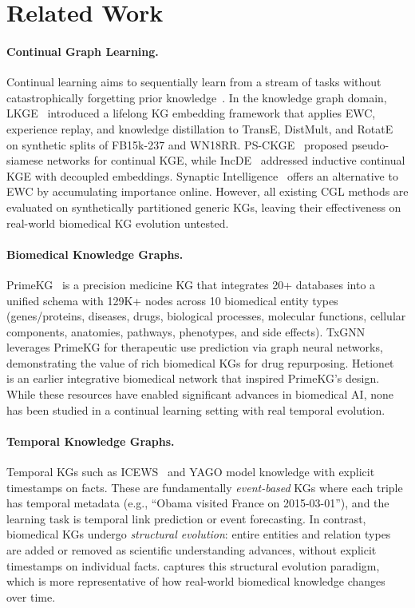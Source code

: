 \section{Related Work}
\label{sec:related}

\paragraph{Continual Graph Learning.}
Continual learning aims to sequentially learn from a stream of tasks without catastrophically forgetting prior knowledge~\citep{Kirkpatrick2017}.
In the knowledge graph domain, LKGE~\citep{Cui2023} introduced a lifelong KG embedding framework that applies EWC, experience replay, and knowledge distillation to TransE, DistMult, and RotatE~\citep{Bordes2013, Yang2015, Sun2019} on synthetic splits of FB15k-237 and WN18RR.
PS-CKGE~\citep{Wu2024} proposed pseudo-siamese networks for continual KGE, while IncDE~\citep{Song2023} addressed inductive continual KGE with decoupled embeddings.
Synaptic Intelligence~\citep{Zenke2017} offers an alternative to EWC by accumulating importance online.
However, all existing CGL methods are evaluated on synthetically partitioned generic KGs, leaving their effectiveness on real-world biomedical KG evolution untested.

\paragraph{Biomedical Knowledge Graphs.}
PrimeKG~\citep{Chandak2023} is a precision medicine KG that integrates 20+ databases into a unified schema with 129K+ nodes across 10 biomedical entity types (genes/proteins, diseases, drugs, biological processes, molecular functions, cellular components, anatomies, pathways, phenotypes, and side effects).
TxGNN~\citep{Huang2024} leverages PrimeKG for therapeutic use prediction via graph neural networks, demonstrating the value of rich biomedical KGs for drug repurposing.
Hetionet~\citep{Himmelstein2017} is an earlier integrative biomedical network that inspired PrimeKG's design.
While these resources have enabled significant advances in biomedical AI, none has been studied in a continual learning setting with real temporal evolution.

\paragraph{Temporal Knowledge Graphs.}
Temporal KGs such as ICEWS~\citep{GarciaDuran2018} and YAGO model knowledge with explicit timestamps on facts.
These are fundamentally \emph{event-based} KGs where each triple has temporal metadata (e.g., ``Obama visited France on 2015-03-01''), and the learning task is temporal link prediction or event forecasting.
In contrast, biomedical KGs undergo \emph{structural evolution}: entire entities and relation types are added or removed as scientific understanding advances, without explicit timestamps on individual facts.
\ours captures this structural evolution paradigm, which is more representative of how real-world biomedical knowledge changes over time.

